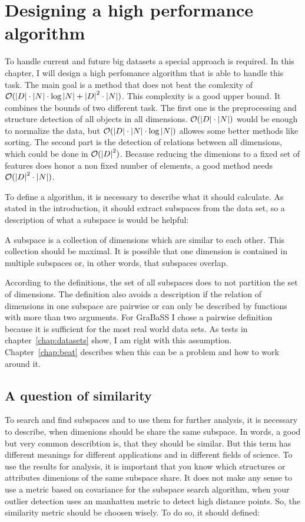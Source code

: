 \chapter{Designing a high performance algorithm}\label{chap:algodesign}
To handle current and future big datasets a special approach is required. In this chapter, I will design a high perfomance algorithm that is able to handle this task. The main goal is a method that does not beat the comlexity of $\mathcal{O} ( \left|D\right| \cdot \left|N\right| \cdot \log{\left|N\right|} + \left|D\right|^2 \cdot \left|N\right| )$. This complexity is a good upper bound. It combines the bounds of two different task. The first one is the preprocessing and structure detection of all objects in all dimensions. $\mathcal{O} ( \left|D\right| \cdot \left|N\right| )$ would be enough to normalize the data, but $\mathcal{O} ( \left|D\right| \cdot \left|N\right| \cdot \log{\left|N\right|} )$ allowes some better methods like sorting. The second part is the detection of relations between all dimensions, which could be done in $\mathcal{O} ( \left|D\right|^2 )$. Because reducing the dimenions to a fixed set of features does honor a non fixed number of elements, a good method needs $\mathcal{O} ( \left|D\right|^2 \cdot \left|N\right| )$.

To define a algorithm, it is necessary to describe what it should calculate. As stated in the introduction, it should extract subspaces from the data set, so a description of what a subspace is would be helpful:
\begin{envdef}[Subspace]
	A subspace is a collection of dimensions which are similar to each other. This collection should be maximal. It is possible that one dimension is contained in multiple subspaces or, in other words, that subspaces overlap.
\end{envdef}

According to the definitions, the set of all subspaces does to not partition the set of dimensions. The definition also avoids a description if the relation of dimensions in one subspace are pairwise or can only be described by functions with more than two arguments. For GraBaSS I chose a pairwise definition because it is sufficient for the most real world data sets. As tests in chapter~\ref{chap:datasets} show, I am right with this assumption. Chapter~\ref{chap:beat} describes when this can be a problem and how to work around it.

\section{A question of similarity}
To search and find subspaces and to use them for further analysis, it is necessary to describe, when dimenions should be share the same subspace. In words, a good but very common describtion is, that they should be similar. But this term has different meanings for different applications and in different fields of science. To use the results for analysis, it is important that you know which structures or attributes dimenions of the same subspace share. It does not make any sense to use a metric based on covariance for the subspace search algorithm, when your outlier detection uses an manhatten metric to detect high distance points. So, the similarity metric should be choosen wisely. To do so, it should defined:

